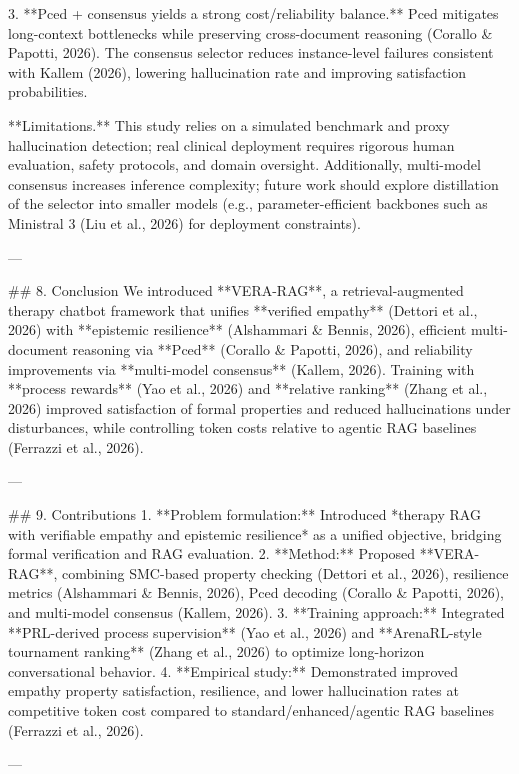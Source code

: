 3. **Pced + consensus yields a strong cost/reliability balance.** Pced mitigates long-context bottlenecks while preserving cross-document reasoning (Corallo & Papotti, 2026). The consensus selector reduces instance-level failures consistent with Kallem (2026), lowering hallucination rate and improving satisfaction probabilities.

**Limitations.** This study relies on a simulated benchmark and proxy hallucination detection; real clinical deployment requires rigorous human evaluation, safety protocols, and domain oversight. Additionally, multi-model consensus increases inference complexity; future work should explore distillation of the selector into smaller models (e.g., parameter-efficient backbones such as Ministral 3 (Liu et al., 2026) for deployment constraints).

---

## 8. Conclusion  
We introduced **VERA-RAG**, a retrieval-augmented therapy chatbot framework that unifies **verified empathy** (Dettori et al., 2026) with **epistemic resilience** (Alshammari & Bennis, 2026), efficient multi-document reasoning via **Pced** (Corallo & Papotti, 2026), and reliability improvements via **multi-model consensus** (Kallem, 2026). Training with **process rewards** (Yao et al., 2026) and **relative ranking** (Zhang et al., 2026) improved satisfaction of formal properties and reduced hallucinations under disturbances, while controlling token costs relative to agentic RAG baselines (Ferrazzi et al., 2026).

---

## 9. Contributions  
1. **Problem formulation:** Introduced *therapy RAG with verifiable empathy and epistemic resilience* as a unified objective, bridging formal verification and RAG evaluation.  
2. **Method:** Proposed **VERA-RAG**, combining SMC-based property checking (Dettori et al., 2026), resilience metrics (Alshammari & Bennis, 2026), Pced decoding (Corallo & Papotti, 2026), and multi-model consensus (Kallem, 2026).  
3. **Training approach:** Integrated **PRL-derived process supervision** (Yao et al., 2026) and **ArenaRL-style tournament ranking** (Zhang et al., 2026) to optimize long-horizon conversational behavior.  
4. **Empirical study:** Demonstrated improved empathy property satisfaction, resilience, and lower hallucination rates at competitive token cost compared to standard/enhanced/agentic RAG baselines (Ferrazzi et al., 2026).

---